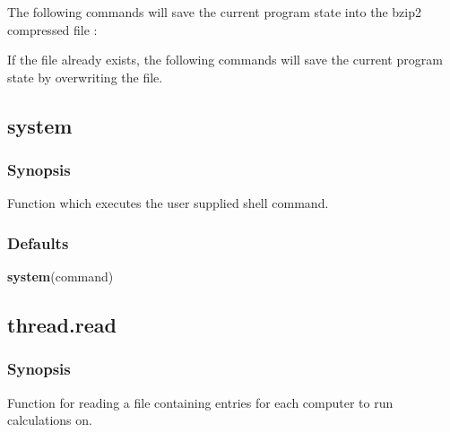  The following commands will save the current program state into the bzip2 compressed file : 
  





 If the file  already exists, the following commands will save the current program state by overwriting the file. 
  



  

 \newpage 

 \subsection{system} 

  
 \subsubsection{Synopsis} 

 Function which executes the user supplied shell command. 
  

  
 \subsubsection{Defaults} 

 \textsf{\textbf{system}(command)} 

  

 \newpage 

 \subsection{thread.read} 

  
 \subsubsection{Synopsis} 

 Function for reading a file containing entries for each computer to run calculations on. 
  

